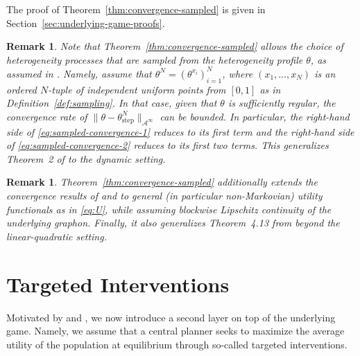 \documentclass[11pt]{article}
\newtheorem{remark}[theorem]{Remark}
\numberwithin{equation}{section}
\begin{document}
The proof of Theorem~\ref{thm:convergence-sampled} is given in Section~\ref{sec:underlying-game-proofs}.
\begin{remark}\label{rem:sampling-option}
Note that Theorem~\ref{thm:convergence-sampled} allows the choice of heterogeneity processes that are sampled from the heterogeneity profile $\theta$, as assumed in \cite{parise2023graphon}. Namely, assume that $\theta^N=(\theta^{x_i})_{i=1}^N$, where $(x_1,\ldots,x_N)$ is an ordered $N$-tuple of independent uniform points from $[0,1]$ as in Definition~\ref{def:sampling}.
In that case, given that $\theta$ is %
sufficiently regular, the convergence rate of $\|\theta-\theta^N_{\operatorname{step}}\|_{\mathcal{A}^\infty}$ can be bounded. In particular, the right-hand side of \eqref{eq:sampled-convergence-1} reduces to its first term and the right-hand side of \eqref{eq:sampled-convergence-2} reduces to its first two terms. This generalizes Theorem~2 of \citet{parise2023graphon} to the dynamic setting.
\end{remark}

\begin{remark}\label{rem:convergence-sampled}
Theorem~\ref{thm:convergence-sampled} additionally extends the convergence results of \citet{aurell2022stochastic} and \citet{carmona2022stochastic} to general (in particular non-Markovian) utility functionals as in \eqref{eq:U}, while assuming blockwise Lipschitz continuity of the underlying graphon. Finally, it also generalizes Theorem~4.13 from \cite{neuman2024stochastic} beyond the linear-quadratic setting.
\end{remark}



\section{Targeted Interventions}\label{sec:interventions}
Motivated by \citet{galeotti2020targeting} and \citet{parise2023graphon}, we now introduce a second layer on top of the underlying game. Namely, we assume that a central planner seeks to maximize the average utility of the population at equilibrium through so-called targeted interventions.
\end{document}
